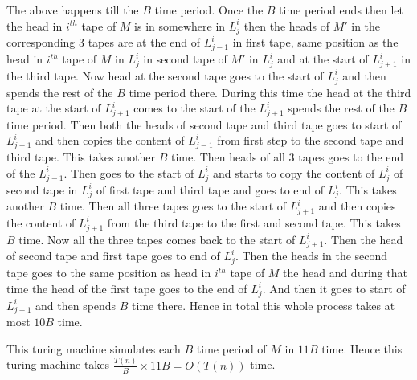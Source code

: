 \documentclass[a4paper, 11pt]{article}
\begin{document}
{The above happens till the $B$ time period. Once the $B$ time period ends then let  the head in $i^{th}$ tape of $M$ is in somewhere in $L_j^i$ then the heads of $M'$ in the corresponding 3 tapes  are at the end of $L_{j-1}^i$ in first tape, same position as the head in $i^{th}$ tape of $M$ in $L_j^i$ in second tape of $M'$ in $L_j^i$ and at the start of $L_{j+1}^i$ in the third tape. Now head at the second tape goes to the start of $L_j^i$ and then spends the rest of the $B$ time period there. During this time the head at the third tape at the start of $L_{j+1}^i$ comes to the start of the $L_{j+1}^i$ spends the rest of the $B$ time period. Then both the heads of second tape and third tape goes to start of $L_{j-1}^i$ and then copies the content of $L_{j-1}^i$ from first step to the second tape and third tape. This takes another $B$ time. Then heads of all 3 tapes goes to the end of the $L_{j-1}^i$. Then goes to the start of $L_j^i$ and starts to copy the content of $L_j^i$ of second tape in $L_j^i$ of first tape and third tape and goes to end of $L_j^i$. This takes another $B$ time. Then all three tapes goes to the start of $L_{j+1}^i$ and then copies the content of $L_{j+1}^i$ from the third tape to the first and second tape. This takes $B$ time. Now all the three tapes comes back to the start of $L_{j+1}^i$. Then the head of second tape and first tape goes to end of $L_{j}^i$. Then the heads in the second tape goes to the same position as head in $i^{th}$ tape of $M$ the head and during that time the head of the first tape goes to the end of $L_j^i$. And then it goes to start of $L_{j-1}^i$ and then spends $B$ time there. Hence in total this whole process takes at most $10B$ time. 

This turing machine simulates each $B$ time period of $M$ in $11B$ time. Hence this turing machine takes $\frac{T(n)}{B}\times 11B=O(T(n))$ time. 
}
\newpage

\end{document}
